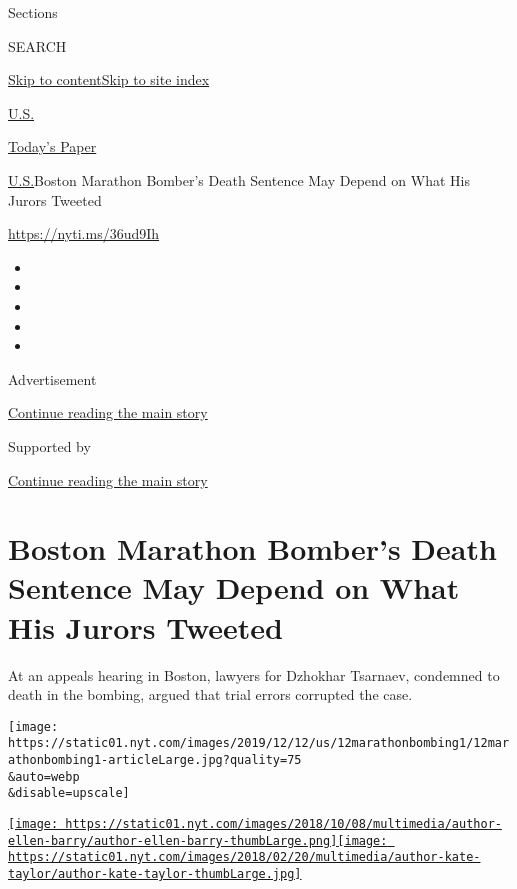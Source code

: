 Sections

SEARCH

\protect\hyperlink{site-content}{Skip to
content}\protect\hyperlink{site-index}{Skip to site index}

\href{https://www.nytimes.com/section/us}{U.S.}

\href{https://myaccount.nytimes.com/auth/login?response_type=cookie\&client_id=vi}{}

\href{https://www.nytimes.com/section/todayspaper}{Today's Paper}

\href{/section/us}{U.S.}\textbar{}Boston Marathon Bomber's Death
Sentence May Depend on What His Jurors Tweeted

\url{https://nyti.ms/36ud9Ih}

\begin{itemize}
\item
\item
\item
\item
\item
\end{itemize}

Advertisement

\protect\hyperlink{after-top}{Continue reading the main story}

Supported by

\protect\hyperlink{after-sponsor}{Continue reading the main story}

\hypertarget{boston-marathon-bombers-death-sentence-may-depend-on-what-his-jurors-tweeted}{%
\section{Boston Marathon Bomber's Death Sentence May Depend on What His
Jurors
Tweeted}\label{boston-marathon-bombers-death-sentence-may-depend-on-what-his-jurors-tweeted}}

At an appeals hearing in Boston, lawyers for Dzhokhar Tsarnaev,
condemned to death in the bombing, argued that trial errors corrupted
the case.

\texttt{[image: https://static01.nyt.com/images/2019/12/12/us/12marathonbombing1/12marathonbombing1-articleLarge.jpg?quality=75\\\&auto=webp\\\&disable=upscale]}

\href{https://www.nytimes.com/by/ellen-barry}{\texttt{[image: https://static01.nyt.com/images/2018/10/08/multimedia/author-ellen-barry/author-ellen-barry-thumbLarge.png]}}\href{https://www.nytimes.com/by/kate-taylor}{\texttt{[image: https://static01.nyt.com/images/2018/02/20/multimedia/author-kate-taylor/author-kate-taylor-thumbLarge.jpg]}}

